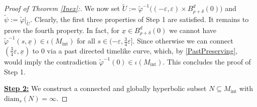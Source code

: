 \documentclass[reqno]{article}
\newcommand{\diam}{\mathrm{diam}}
\newcommand{\Mint}{M_{\mathrm{int}}}
\begin{document}
\begin{proof}[Proof of Theorem \ref{Inex}:]
We now set $\tilde{U} := \tilde{\varphi}^{-1} \big( (-\varepsilon, \varepsilon) \times B_{\rho + \delta}^d(0)\big)$ and $\tilde{\psi} := \tilde{\varphi}\big|_{\tilde{U}}$. Clearly, the first three properties of Step 1 are satisfied.
It remains to prove the fourth property. In fact, for $\underline{x} \in B^d_{\rho + \delta}(0)$ we cannot have $\tilde{\varphi}^{-1}(s,\underline{x}) \in \iota(\Mint)$ for all $s \in (-\varepsilon, \frac{3}{4} \varepsilon]$. Since otherwise we can connect $(\frac{3}{4} \varepsilon,  \underline{x})$ to $0$ via a past directed timelike curve, which, by \eqref{PastPreserving}, would imply the contradiction $\tilde{\varphi}^{-1}(0) \in \iota(\Mint)$.
This concludes the proof of Step 1.
\vspace*{2mm}












\underline{\textbf{Step 2:}} We construct a connected and globally hyperbolic subset $N \subseteq \Mint$ with $\diam_s(N) = \infty$.
\vspace*{5mm}


\end{proof}
\end{document}

